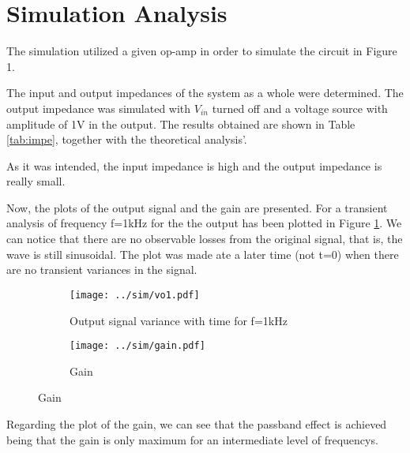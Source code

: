 \section{Simulation Analysis} \label{sec:simulation}


The simulation utilized a given op-amp in order to simulate the circuit in Figure 1. 



The input and output impedances of the system as a whole were determined. The output impedance was simulated with $V_{in}$ turned off and a voltage source with amplitude of 1V in the output. The results obtained are shown in Table \ref{tab:impe}, together with the theoretical analysis'.

\par

As it was intended, the input impedance is high and the output impedance is really small.
\par
Now, the plots of the output signal and the gain are presented. For a transient analysis of frequency f=1kHz for the the output has been plotted in Figure \ref{fig:out1}. We can notice that there are no observable losses from the original signal, that is, the wave is still sinusoidal. The plot was made ate a later time (not t=0) when there are no transient variances in the signal.

\begin{figure}[H]
  \begin{subfigure}{.49\linewidth}
    \centering
    \texttt{[image: ../sim/vo1.pdf]}
    \footnotesize
  \caption{Output signal variance with time for f=1kHz}
   \label{fig:out1}
  \end{subfigure}
  \hspace{5mm}
  \begin{subfigure}{.49\linewidth}
    \centering
  \texttt{[image: ../sim/gain.pdf]}
  \caption{Gain}
  \label{fig:out2}
  \end{subfigure}
\end{figure}

Regarding the plot of the gain, we can see that the passband effect is achieved being that the gain is only maximum for an intermediate level of frequencys.

